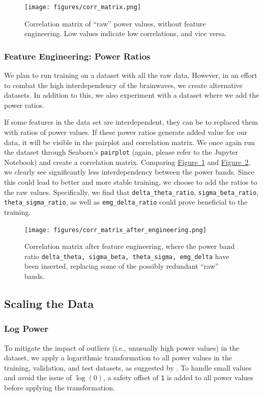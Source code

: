 \documentclass{article}
\begin{document}
\begin{multicols}{2}
\begin{figure}[H]
    \centering
    \texttt{[image: figures/corr\_matrix.png]} 
    \caption{Correlation matrix of ``raw'' power values, without feature engineering. Low values indicate low correlations, and vice versa.}
    \label{fig:corr_matrix}
\end{figure}

\subsubsection*{Feature Engineering: Power Ratios}
We plan to run training on a dataset with all the raw data.
However, in an effort to combat the high interdependency of the brainwaves, we create alternative datasets. In addition to this, we also experiment with a dataset where we add the power ratios.

If some features in the data set are interdependent, they can be to replaced them with ratios of power values. If these power ratios generate added value for our data, it will be visible in the pairplot and correlation matrix. We once again run the dataset through Seaborn's \texttt{pairplot} (again, please refer to the Jupyter Notebook) and create a correlation matrix. Comparing  \hyperref[fig:corr_matrix]{Figure~\ref*{fig:corr_matrix}} and \hyperref[fig:corr_matrix_after]{Figure~\ref*{fig:corr_matrix_after}}, we clearly see significantly less interdependency between the power bands. Since this could lead to better and more stable training, we choose to add the ratios to the raw values. Specifically, we find that \texttt{delta\_theta\_ratio}, \texttt{sigma\_beta\_ratio}, \texttt{theta\_sigma\_ratio}, as well as \texttt{emg\_delta\_ratio} could prove beneficial to the training.

\begin{figure}[H]
    \centering
    \texttt{[image: figures/corr\_matrix\_after\_engineering.png]} 
    \caption{Correlation matrix after feature engineering, where the power band ratio \texttt{delta\_theta, sigma\_beta, theta\_sigma, emg\_delta} have been inserted, replacing some of the possibly redundant ``raw'' bands.}
    \label{fig:corr_matrix_after}
\end{figure}

\subsection*{Scaling the Data}
\subsubsection*{Log Power}
To mitigate the impact of outliers (i.e., unusually high power values) in the dataset, we apply a logarithmic transformation to all power values in the training, validation, and test datasets, as suggested by \cite{miladinovic_SPINDLE_2019}. To handle small values and avoid the issue of $\log(0)$, a safety offset of \texttt{1} is added to all power values before applying the transformation.


\end{multicols}
\end{document}

